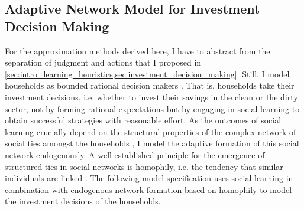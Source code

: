 \subsection{Adaptive Network Model for Investment Decision Making}
\label{sec:investment_decision_making_descr.}
For the approximation methods derived here, I have to abstract from the separation of judgment and actions that I proposed in \cref{sec:intro_learning_heuristics,sec:investment_decision_making}.
Still, I model households as bounded rational decision makers \citep{simon1972theories, simon1982models, gigerenzer2002bounded}.
That is, households take their investment decisions, i.e. whether to invest their savings in the clean or the dirty sector, not by forming rational expectations \citep{Evans2006, Kirman2014} but by engaging in social learning \citep{Bandura1971} to obtain successful strategies \citep{Traulsen2010} with reasonable effort.
As the outcomes of social learning crucially depend on the structural properties of the complex network of social ties amongst the households \citep{Barkoczi2016}, I model the adaptive formation of this social network endogenously.
A well established principle for the emergence of structured ties in social networks is homophily, i.e. the tendency that similar individuals are linked \citep{McPherson2007, Centola2007, Centola2011}.
The following model specification uses social learning in combination with endogenous network formation based on homophily to model the investment decisions of the households.


